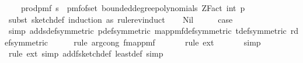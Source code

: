 \begin{isabellebody}
\ \ \ \ {\isacharparenleft}{\kern0pt}prod{\isacharunderscore}{\kern0pt}pmf\ {\isacharbraceleft}{\kern0pt}{}{\isachardot}{\kern0pt}{\isachardot}{\kern0pt}{\isacharless}{\kern0pt}s{\isacharbraceright}{\kern0pt}\ {\isacharparenleft}{\kern0pt}{\isasymlambda}{\isacharunderscore}{\kern0pt}{\isachardot}{\kern0pt}\ pmf{\isacharunderscore}{\kern0pt}of{\isacharunderscore}{\kern0pt}set\ {\isacharparenleft}{\kern0pt}bounded{\isacharunderscore}{\kern0pt}degree{\isacharunderscore}{\kern0pt}polynomials\ {\isacharparenleft}{\kern0pt}ZFact\ {\isacharparenleft}{\kern0pt}int\ p{\isacharparenright}{\kern0pt}{\isacharparenright}{\kern0pt}\ {}{\isacharparenright}{\kern0pt}{\isacharparenright}{\kern0pt}{\isacharparenright}{\kern0pt}{\isachardoublequoteclose}\ \isanewline
%
\isadelimproof
%
\endisadelimproof
%
\isatagproof
{}\isamarkupfalse%
\ {\isacharparenleft}{\kern0pt}subst\ sketch{\isacharunderscore}{\kern0pt}def{\isacharcomma}{\kern0pt}\ induction\ as\ rule{\isacharcolon}{\kern0pt}rev{\isacharunderscore}{\kern0pt}induct{\isacharparenright}{\kern0pt}\isanewline
\ \ \isamarkupfalse%
\ Nil\isanewline
\ \ \isamarkupfalse%
\ \isamarkupfalse%
\ {\isacharquery}{\kern0pt}case\isanewline
\ \ \ \ \isamarkupfalse%
\ {\isacharparenleft}{\kern0pt}simp\ add{\isacharcolon}{\kern0pt}s{\isacharunderscore}{\kern0pt}def{\isacharbrackleft}{\kern0pt}symmetric{\isacharbrackright}{\kern0pt}\ p{\isacharunderscore}{\kern0pt}def{\isacharbrackleft}{\kern0pt}symmetric{\isacharbrackright}{\kern0pt}\ map{\isacharunderscore}{\kern0pt}pmf{\isacharunderscore}{\kern0pt}def{\isacharbrackleft}{\kern0pt}symmetric{\isacharbrackright}{\kern0pt}\ t{\isacharunderscore}{\kern0pt}def{\isacharbrackleft}{\kern0pt}symmetric{\isacharbrackright}{\kern0pt}\ r{\isacharunderscore}{\kern0pt}def{\isacharbrackleft}{\kern0pt}symmetric{\isacharbrackright}{\kern0pt}{\isacharparenright}{\kern0pt}\isanewline
\ \ \ \ \isamarkupfalse%
\ {\isacharparenleft}{\kern0pt}rule\ arg{\isacharunderscore}{\kern0pt}cong{}{\isacharbrackleft}{\kern0pt}\ f{\isacharequal}{\kern0pt}{\isachardoublequoteopen}map{\isacharunderscore}{\kern0pt}pmf{\isachardoublequoteclose}{\isacharbrackright}{\kern0pt}{\isacharparenright}{\kern0pt}\isanewline
\ \ \ \ \ \isamarkupfalse%
\ {\isacharparenleft}{\kern0pt}rule\ ext{\isacharparenright}{\kern0pt}\isanewline
\ \ \ \ \ \isamarkupfalse%
\ simp\isanewline
\ \ \ \ \isamarkupfalse%
\ {\isacharparenleft}{\kern0pt}rule\ ext{\isacharcomma}{\kern0pt}\ simp\ add{\isacharcolon}{\kern0pt}f{}{\isacharunderscore}{\kern0pt}sketch{\isacharunderscore}{\kern0pt}def\ least{\isacharunderscore}{\kern0pt}def{\isacharcomma}{\kern0pt}\ simp{\isacharparenright}{\kern0pt}\isanewline

\end{isabellebody}

